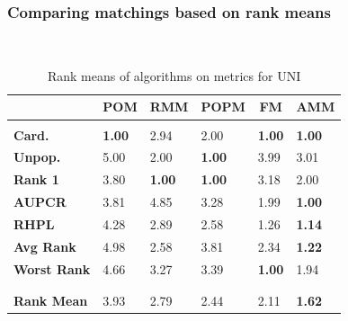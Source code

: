 \documentclass[letterpaper]{article} %
\begin{document}
\subsubsection{Comparing matchings based on rank means} ~\\
\begin{table}[h]
\setlength\tabcolsep{4.2pt}
\begin{center}
\begin{tabular}{llllll}
\multicolumn{1}{c}{}
&\multicolumn{1}{c}{\bf POM}
&\multicolumn{1}{c}{\bf RMM}
&\multicolumn{1}{c}{\bf POPM}
&\multicolumn{1}{c}{\bf FM}
&\multicolumn{1}{c}{\bf AMM}
\\ \hline  \\
\textbf{Card.} & \textbf{1.00} & 2.94 & 2.00 & \textbf{1.00} & \textbf{1.00} \\
\textbf{Unpop.} & 5.00 & 2.00 & \textbf{1.00} & 3.99 & 3.01 \\
\textbf{Rank 1} & 3.80 & \textbf{1.00} & \textbf{1.00} & 3.18 & 2.00 \\
\textbf{AUPCR} & 3.81 & 4.85 & 3.28 & 1.99 & \textbf{1.00} \\
\textbf{RHPL} & 4.28 & 2.89 & 2.58 & 1.26 & \textbf{1.14} \\
\textbf{Avg Rank} & 4.98 & 2.58 & 3.81 & 2.34 & \textbf{1.22} \\
\textbf{Worst Rank} & 4.66 & 3.27 & 3.39 & \textbf{1.00} & 1.94 \\

\\ \hline \\
\textbf{Rank Mean} & 3.93 & 2.79 & 2.44 & 2.11 & \textbf{1.62} \\
\end{tabular}
\end{center}
\caption{Rank means of algorithms on metrics for UNI}
\label{tab:rank_metrics}
\end{table}
\end{document}

